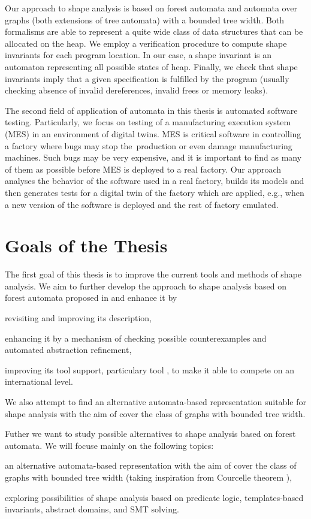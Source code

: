 Our approach to shape analysis is based on forest automata and automata over graphs
(both extensions of tree automata) with a bounded tree width.
Both formalisms are able to represent a quite wide class of data structures that can be
allocated on the heap.
We employ a verification procedure to compute shape invariants for each program location.
In our case, a shape invariant is an automaton representing all possible states of heap.
Finally, we check that shape invariants imply that a given specification is fulfilled by the program
(usually checking absence of invalid dereferences, invalid frees or memory leaks).

The second field of application of automata in this thesis is automated software testing.
Particularly, we focus on testing of a manufacturing execution system (MES) in an environment of digital twins.
MES is critical software in controlling a factory where bugs may stop
the~production or even damage manufacturing machines.
Such bugs may be very expensive, and it is important to find as many of them as possible
before MES is deployed to a real factory.
Our approach analyses the behavior of the software used in a real factory, builds its models and then
generates tests for a digital twin of the factory which are applied, e.g., when a new version of the software is deployed
and the rest of factory emulated.

\section{Goals of the Thesis}
The first goal of this thesis is to improve the current tools and methods of shape analysis.
We aim to further develop the approach to shape analysis based on forest automata proposed in \cite{forester11,boxes13}
and enhance it by
\begin{enumerate*}
  \item revisiting and improving its description,
  \item enhancing it by a mechanism of checking possible counterexamples and automated abstraction refinement,
  \item improving its tool support, particulary tool \forester, to make it able to compete on an international level.
\end{enumerate*}
We also attempt to find an alternative automata-based representation suitable for shape analysis
with the aim of cover the class of graphs with bounded tree width.

Futher we want to study possible alternatives to shape analysis based on forest automata.
We will focuse mainly on the following topics:
\begin{enumerate*}
  \item an alternative automata-based representation with the aim of cover the class of graphs with bounded tree width (taking inspiration from Courcelle theorem \cite{Courcelle}),
  \item exploring possibilities of shape analysis based on predicate logic, templates-based invariants, abstract domains, and SMT solving.
\end{enumerate*}

